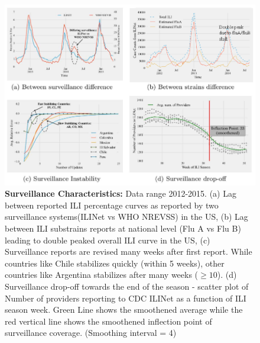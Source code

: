 \documentclass[10pt,letterpaper]{article}
\begin{document}

\begin{figure}[!h]
  \centering
  \includegraphics[width=0.96\linewidth]{./figs/Fig1.eps}

  \caption{\textbf{Surveillance Characteristics:} Data range 2012-2015.
  (a)  Lag between reported ILI percentage curves as reported by two 
  surveillance systems(ILINet vs WHO NREVSS) in the US,
  (b)  Lag between ILI substrains reports at national level (Flu A vs Flu B)
  leading to double peaked overall ILI curve in the US,
  (c) Surveillance reports are revised many weeks after first report.
  While countries like Chile stabilizes quickly (within 5 weeks), 
  other countries like Argentina stabilizes after many weeks ($\geq 10$). 
  (d) Surveillance drop-off towards the end of the season - scatter plot of 
  Number of providers reporting to CDC ILINet as a function of ILI season 
  week. Green Line shows the smoothened average while the red vertical
  line shows the smoothened inflection point of surveillance coverage. 
  (Smoothing interval = 4)
  \label{fig1}
  }
\end{figure}
\end{document}
